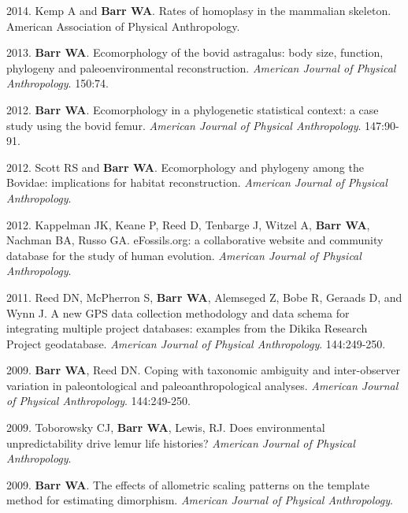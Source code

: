 \documentclass{article}
\begin{document}
\begin{etaremune}
\item 2014. Kemp A and {\bfseries Barr WA}. Rates of homoplasy in the mammalian skeleton. American Association of Physical Anthropology.


\item 2013. {\bfseries Barr WA}. Ecomorphology of the bovid astragalus: body size, function, phylogeny and paleoenvironmental reconstruction. \emph{American Journal of Physical Anthropology}. 150:74.


\item 2012. {\bfseries Barr WA}. Ecomorphology in a phylogenetic statistical context: a case study using the bovid femur. \emph{American Journal of Physical Anthropology}. 147:90-91.

\item 2012. Scott RS and {\bfseries Barr WA}. Ecomorphology and phylogeny among the Bovidae: implications for habitat reconstruction. \emph{American Journal of Physical Anthropology}.

\item 2012. Kappelman JK, Keane P, Reed D, Tenbarge J, Witzel A, {\bfseries Barr WA}, Nachman BA, Russo GA. eFossils.org: a collaborative website and community database for the study of human evolution. \emph{American Journal of Physical Anthropology}.


\item 2011. Reed DN, McPherron S, {\bfseries Barr WA}, Alemseged Z, Bobe R, Geraads D, and Wynn J. A new GPS data collection methodology and data schema for integrating multiple project databases: examples from the Dikika Research Project geodatabase. \emph{American Journal of Physical Anthropology}. 144:249-250.


\item 2009. {\bfseries Barr WA}, Reed DN. Coping with taxonomic ambiguity and inter-observer variation in paleontological and paleoanthropological analyses. \emph{American Journal of Physical Anthropology}. 144:249-250.


\item 2009. Toborowsky CJ, {\bfseries Barr WA}, Lewis, RJ. Does environmental unpredictability drive lemur life histories? \emph{American Journal of Physical Anthropology}.


\item 2009. {\bfseries Barr WA}. The effects of allometric scaling patterns on the template method for estimating dimorphism. \emph{American Journal of Physical Anthropology}.


\end{etaremune}
\end{document}
